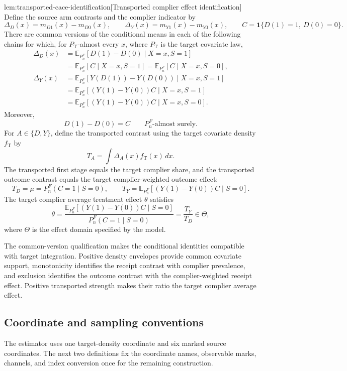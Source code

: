 \begin{lemmav}{lem:transported-cace-identification}[Transported complier effect identification]
Define the source arm contrasts and the complier indicator by
\[
\Delta_D(x)=m_{D1}(x)-m_{D0}(x),
\qquad
\Delta_Y(x)=m_{Y1}(x)-m_{Y0}(x),
\qquad
C=\mathbf 1\{D(1)=1,\ D(0)=0\}.
\]
There are common versions of the conditional means in each of the following chains for which, for \(P_{\mathrm T}\)-almost every \(x\), where \(P_{\mathrm T}\) is the target covariate law,
\[
\begin{aligned}
\Delta_D(x)
&=\mathbb E_{P_n^F}[D(1)-D(0)\mid X=x,S=1]\\
&=\mathbb E_{P_n^F}[C\mid X=x,S=1]
 =\mathbb E_{P_n^F}[C\mid X=x,S=0],\\
\Delta_Y(x)
&=\mathbb E_{P_n^F}[Y(D(1))-Y(D(0))\mid X=x,S=1]\\
&=\mathbb E_{P_n^F}[(Y(1)-Y(0))C\mid X=x,S=1]\\
&=\mathbb E_{P_n^F}[(Y(1)-Y(0))C\mid X=x,S=0].
\end{aligned}
\]
Moreover,
\[
D(1)-D(0)=C
\qquad P_n^F\text{-almost surely}.
\]
For \(A\in\{D,Y\}\), define the transported contrast using the target covariate density \(f_{\mathrm T}\) by
\[
T_A=\int \Delta_A(x)f_{\mathrm T}(x)\,dx.
\]
The transported first stage equals the target complier share, and the transported outcome contrast equals the target complier-weighted outcome effect:
\[
T_D=\mu=P_n^F(C=1\mid S=0),
\qquad
T_Y=\mathbb E_{P_n^F}[(Y(1)-Y(0))C\mid S=0].
\]
The target complier average treatment effect \(\theta\) satisfies
\[
\theta
=\frac{\mathbb E_{P_n^F}[(Y(1)-Y(0))C\mid S=0]}
       {P_n^F(C=1\mid S=0)}
=\frac{T_Y}{T_D}
\in\Theta,
\]
where \(\Theta\) is the effect domain specified by the model.
\end{lemmav}

The common-version qualification makes the conditional identities compatible with target integration. Positive density envelopes provide common covariate support, monotonicity identifies the receipt contrast with complier prevalence, and exclusion identifies the outcome contrast with the complier-weighted receipt effect. Positive transported strength makes their ratio the target complier average effect.

\subsection{Coordinate and sampling conventions}

The estimator uses one target-density coordinate and six marked source coordinates. The next two definitions fix the coordinate names, observable marks, channels, and index conversion once for the remaining construction.

